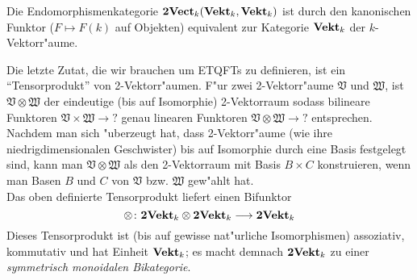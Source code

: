 \begin{Bsp}
Die Endomorphismenkategorie $\mathbf{2Vect}_k(\mathbf{Vekt}_k,\mathbf{Vekt}_k)$ ist durch den kanonischen Funktor ($F\mapsto F(k)$ auf Objekten) equivalent zur Kategorie $\mathbf{Vekt}_k$ der $k$-Vektorr"aume.
\end{Bsp}

Die letzte Zutat, die wir brauchen um ETQFTs zu definieren, ist ein ``Tensorprodukt'' von 2-Vektorr"aumen. F"ur zwei 2-Vektorr"aume $\mathfrak V$ und $\mathfrak W$, ist $\mathfrak V\otimes\mathfrak W$ der eindeutige (bis auf Isomorphie) 2-Vektorraum sodass bilineare Funktoren $\mathfrak V\times\mathfrak W\longrightarrow ?$ genau linearen Funktoren $\mathfrak V\otimes\mathfrak W\longrightarrow ?$ entsprechen. Nachdem man sich "uberzeugt hat, dass 2-Vektorr"aume (wie ihre niedrigdimensionalen Geschwister) bis auf Isomorphie durch eine Basis festgelegt sind, kann man $\mathfrak V\otimes\mathfrak W$ als den 2-Vektorraum mit Basis $B\times C$ konstruieren, wenn man Basen $B$ und $C$ von $\mathfrak V$ bzw. $\mathfrak W$ gew"ahlt hat.\\


Das oben definierte Tensorprodukt liefert einen Bifunktor
\[\otimes\colon \mathbf{2Vekt}_k\otimes\mathbf{2Vekt}_k\longrightarrow \mathbf{2Vekt}_k\]
Dieses Tensorprodukt ist (bis auf gewisse nat"urliche Isomorphismen) assoziativ, kommutativ und hat Einheit $\mathbf{Vekt}_k$; es macht demnach $\mathbf{2Vekt}_k$ zu einer \emph{symmetrisch monoidalen Bikategorie}.
%
%
%
%
%
%
%